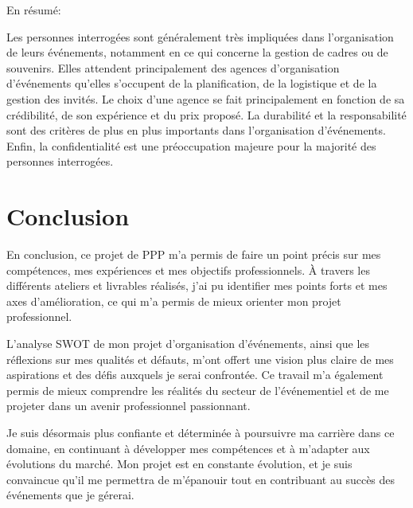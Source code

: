 \documentclass[a4paper,12pt]{article}
\begin{document}
\bigskip
En résumé:

Les personnes interrogées sont généralement très impliquées dans l'organisation de leurs événements, notamment en ce qui concerne la gestion de cadres ou de souvenirs. Elles attendent principalement des agences d'organisation d'événements qu'elles s'occupent de la planification, de la logistique et de la gestion des invités. Le choix d'une agence se fait principalement en fonction de sa crédibilité, de son expérience et du prix proposé. La durabilité et la responsabilité sont des critères de plus en plus importants dans l'organisation d'événements. Enfin, la confidentialité est une préoccupation majeure pour la majorité des personnes interrogées.

\section*{\color{myblue} Conclusion}
En conclusion, ce projet de PPP m’a permis de faire un point précis sur mes compétences, mes expériences et mes objectifs professionnels. À travers les différents ateliers et livrables réalisés, j’ai pu identifier mes points forts et mes axes d’amélioration, ce qui m’a permis de mieux orienter mon projet professionnel. 

L’analyse SWOT de mon projet d’organisation d’événements, ainsi que les réflexions sur mes qualités et défauts, m’ont offert une vision plus claire de mes aspirations et des défis auxquels je serai confrontée. Ce travail m’a également permis de mieux comprendre les réalités du secteur de l’événementiel et de me projeter dans un avenir professionnel passionnant. 

Je suis désormais plus confiante et déterminée à poursuivre ma carrière dans ce domaine, en continuant à développer mes compétences et à m’adapter aux évolutions du marché. Mon projet est en constante évolution, et je suis convaincue qu’il me permettra de m’épanouir tout en contribuant au succès des événements que je gérerai.
\end{document}
